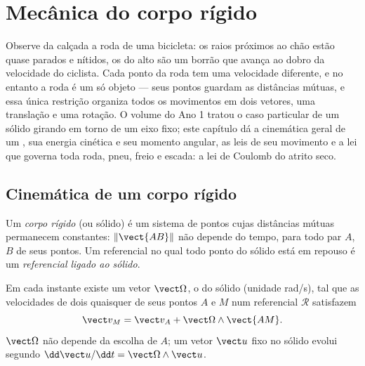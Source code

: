 \chapter{Mecânica do corpo rígido}\label{ch:b2:rigid-body-mechanics}

Observe da calçada a roda de uma bicicleta: os raios próximos ao chão
estão quase parados e nítidos, os do alto são um borrão que avança ao
dobro da velocidade do ciclista. Cada ponto da roda tem uma velocidade
diferente, e no entanto a roda é um só objeto --- seus pontos guardam
as distâncias mútuas, e essa única restrição organiza todos os
movimentos em dois vetores, uma translação e uma rotação. O volume do
Ano 1 tratou o caso particular de um sólido girando em torno de um eixo
fixo; este capítulo dá a cinemática geral de um , sua
energia cinética e seu momento angular, as leis de seu movimento e a
lei que governa toda roda, pneu, freio e escada: a lei de Coulomb do
atrito seco.

\section{Cinemática de um corpo rígido}

\begin{definition}\label{def:b2:rigid-body-mechanics:solid}
Um \emph{corpo rígido} (ou sólido) é um sistema de pontos cujas
distâncias mútuas permanecem constantes: $\|\vect{AB}\|$ não depende do
tempo, para todo par $A$, $B$ de seus pontos. Um referencial no qual
todo ponto do sólido está em repouso é um \emph{referencial ligado ao sólido}.
\end{definition}

\begin{theorem}\label{thm:b2:rigid-body-mechanics:field}
Em cada instante existe um vetor $\vect\Omega$, o \emph{} do sólido (unidade \unit{rad/s}), tal que as velocidades de
dois quaisquer de seus pontos $A$ e $M$ num referencial $\mathcal R$ satisfazem
\[
\vect v_M = \vect v_A + \vect\Omega\wedge\vect{AM} .
\]
$\vect\Omega$ não depende da escolha de $A$; um vetor $\vect u$ fixo no
sólido evolui segundo $\dd\vect u/\dd t = \vect\Omega\wedge\vect u$.
\end{theorem}

